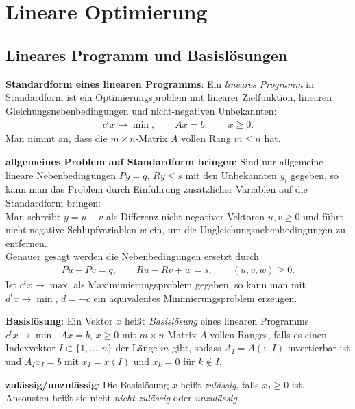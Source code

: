\section{%
    Lineare Optimierung%
}

\subsection{%
    Lineares Programm und Basislösungen%
}

\textbf{Standardform eines linearen Programms}:
Ein \emph{lineares Programm} in Standardform ist ein Optimierungsproblem
mit linearer Zielfunktion,
linearen Gleichungsnebenbedingungen und nicht-negativen Unbekannten:
\begin{align*}
    c^t x \rightarrow \min, \qquad
    Ax = b, \qquad
    x \ge 0.
\end{align*}
Man nimmt an, dass die $m \times n$-Matrix $A$ vollen Rang $m \le n$ hat.

\textbf{allgemeines Problem auf Standardform bringen}:
Sind nur allgemeine lineare Nebenbedingungen
$Py = q$, $Ry \le s$ mit den Unbekannten $y_i$ gegeben, so kann man das Problem
durch Einführung zusätzlicher Variablen auf die Standardform bringen: \\
Man schreibt $y = u - v$ als Differenz nicht-negativer Vektoren $u, v \ge 0$
und führt nicht-negative Schlupfvariablen $w$ ein, um
die Ungleichungsnebenbedingungen zu entfernen. \\
Genauer gesagt werden die Nebenbedingungen ersetzt durch
\begin{align*}
    Pu - Pv = q, \qquad
    Ru - Rv + w = s, \qquad
    (u, v, w) \ge 0.
\end{align*}
Ist $c^t x \rightarrow \max$ als Maximimierungsproblem gegeben, so kann man
mit $d^t x \rightarrow \min$, $d = -c$ ein äquivalentes Minimierungsproblem
erzeugen.

\linie

\textbf{Basislösung}:
Ein Vektor $x$ heißt \emph{Basislösung} eines linearen Programms
$c^t x \rightarrow \min$, $Ax = b$, $x \ge 0$ mit $m \times n$-Matrix $A$
vollen Ranges, falls es einen Indexvektor
$I \subset \{1, \dotsc, n\}$ der Länge $m$ gibt, sodass
$A_I = A(:, I)$ invertierbar ist und $A_I x_I = b$ mit $x_I = x(I)$
und $x_k = 0$ für $k \notin I$.

\textbf{zulässig/unzulässig}:
Die Basislösung $x$ heißt \emph{zulässig}, falls $x_I \ge 0$ ist.
Ansonsten heißt sie nicht \emph{nicht zulässig} oder \emph{unzulässig}.

